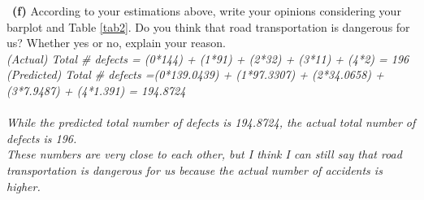 \documentclass[a4 paper]{article}
\numberwithin{equation}{section}
\newcommand{\subproblem}[1]{~\newline\textbf{(#1)}}
\newcommand{\0}{\mathbf{0}}
\begin{document}
	\subproblem{f} According to your estimations above, write your opinions considering your barplot and Table \ref{tab2}. Do you think that road transportation is dangerous for us? Whether yes or no, explain your reason.\\
	{\color{purple}\phantom{x}\textit{(Actual) Total \# defects = (0*144) + (1*91) + (2*32) + (3*11) + (4*2) = 196}}\\
	{\color{purple}\phantom{x}\textit{(Predicted) Total \# defects =(0*139.0439) + (1*97.3307) + (2*34.0658) + (3*7.9487) + (4*1.391) = 194.8724}}\\\\
	{\color{purple}\phantom{x}\hspace{6ex}\textit{While the predicted total number of defects is 194.8724, the actual total number of defects is 196.\\
These numbers are very close to each other, but I think I can still say that road transportation is dangerous for us because the actual number of accidents is higher.}}\\\\
\end{document}
